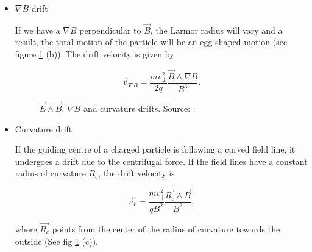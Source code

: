 \documentclass[a4paper,12pt,oneside]{book}
\begin{document}
\begin{itemize}

\item $\nabla B$ drift

If we have a $\nabla B$ perpendicular to $\vec{B}$, the Larmor radius will vary and a result, the total motion of the particle will be an egg-shaped motion (see figure \ref{fig EB y gradB drift} (b)). The drift velocity is given by

\begin{equation}\label{nablaB drift}
\vec{v}_{\nabla B}=\dfrac{m v_{\perp}^2}{2q} \dfrac{\vec{B} \wedge \nabla B}{B^3}.
\end{equation}



\begin{figure}[htbp]
\centering
{}
\hfill
{}
\hfill
{}
\caption{$\vec{E} \wedge \vec{B}$, $\nabla B$ and curvature drifts. Source: \cite{Wesson}.}
\label{fig EB y gradB drift}
\end{figure}



\item Curvature drift

If the guiding centre of a charged particle is following a curved field line, it undergoes a drift due to the centrifugal force. If the field lines have a constant radius of curvature $R_\text{c}$, the drift velocity is

\begin{equation}
\vec{v}_\text{c}=\dfrac{m v_{\parallel}^2}{q B^2} \dfrac{\vec{R_\text{c}} \wedge \vec{B}}{B^2},
\end{equation}

where $\vec{R_\text{c}}$ points from the center of the radius of curvature towards the outside (See fig \ref{fig EB y gradB drift} (c)).


\end{itemize}
\end{document}
